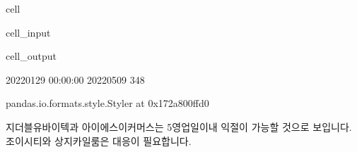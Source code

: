 \documentclass[letterpaper,10pt,english]{jupyterBook}
\begin{document}
\begin{sphinxuseclass}{cell}\begin{sphinxVerbatimInput}

\begin{sphinxuseclass}{cell_input}
\begin{sphinxVerbatim}[commandchars=\\\{\}]
  

    
         
    
\end{sphinxVerbatim}

\end{sphinxuseclass}\end{sphinxVerbatimInput}
\begin{sphinxVerbatimOutput}

\begin{sphinxuseclass}{cell_output}
\begin{sphinxVerbatim}[commandchars=\\\{\}]
2022\PYGZhy{}01\PYGZhy{}29 00:00:00 2022\PYGZhy{}05\PYGZhy{}09
348
\end{sphinxVerbatim}

\begin{sphinxVerbatim}[commandchars=\\\{\}]
\PYGZlt{}pandas.io.formats.style.Styler at 0x172a800ffd0\PYGZgt{}
\end{sphinxVerbatim}

\end{sphinxuseclass}\end{sphinxVerbatimOutput}

\end{sphinxuseclass}
\sphinxAtStartPar
 지더블유바이텍과 아이에스이커머스는 5영업일이내 익절이 가능할 것으로 보입니다. 조이시티와 상지카일룸은 대응이 필요합니다.
\end{document}
